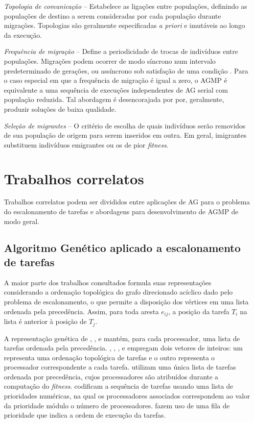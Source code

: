 \documentclass[fleqn,10pt]{SelfArx} %
\begin{document}
\textit{Topologia de comunicação} -- Estabelece as ligações entre populações, definindo as populações de destino a serem consideradas por cada população durante migrações. Topologias são geralmente especificadas \textit{a priori} e imutáveis ao longo da execução. \cite{cantu1998survey}


\textit{Frequência de migração} -- Define a periodicidade de trocas de indivíduos entre populações. Migrações podem ocorrer de modo síncrono num intervalo predeterminado de gerações, ou assíncrono sob satisfação de uma condição \cite{cantu1998survey}. Para o caso especial em que a frequência de migração é igual a zero, o AGMP é equivalente a uma sequência de execuções independentes de AG serial com população reduzida. Tal abordagem é desencorajada por \citeauthor{Cantu-Paz2003} por, geralmente, produzir soluções de baixa qualidade.


\textit{Seleção de migrantes} -- O critério de escolha de quais indivíduos serão removidos de sua população de origem para serem inseridos em outra. Em geral, imigrantes substituem indivíduos emigrantes ou os de pior \textit{fitness}. \cite{cantu1998survey}


\section{Trabalhos correlatos}

Trabalhos correlatos podem ser divididos entre aplicações de AG para o problema do escalonamento de tarefas e abordagens para desenvolvimento de AGMP de modo geral.

\subsection{Algoritmo Genético aplicado a escalonamento de tarefas}

 A maior parte dos trabalhos consultados formula suas representações considerando a ordenação topológica do grafo direcionado acíclico dado pelo problema de escalonamento, o que permite a disposição dos vértices em uma lista ordenada pela precedência. Assim, para toda aresta \(e_{ij}\), a posição da tarefa \(T_i\) na lista é anterior à posição de \(T_j\).

A representação genética de \citeauthor{Hou1994}, \citeauthor{Correa}, e \citeauthor{Kaur_heuristicsbased} mantém, para cada processador, uma lista de tarefas ordenada pela precedência. \citeauthor{WANG19978}, \citeauthor{OMARA201013}, \citeauthor{CHITRA20112725}, e \citeauthor{Morady} empregam dois vetores de inteiros: um representa uma ordenação topológica de tarefas e o outro representa o processador correspondente a cada tarefa. \citeauthor{Kwok:1997:ESA:274066.274077} utilizam uma única lista de tarefas ordenada por precedência, cujos processadores são atribuídos durante a computação do \textit{fitness}. \citeauthor{HWANG2008976} codificam a sequência de tarefas usando uma lista de prioridades numéricas, na qual os processadores associados correspondem ao valor da prioridade módulo o número de processadores. \citeauthor{XU2014255} fazem uso de uma fila de prioridade que indica a ordem de execução da tarefas.
\end{document}
